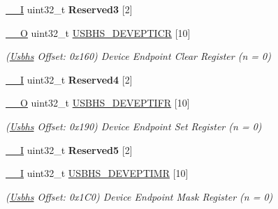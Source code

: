 \begin{DoxyCompactItemize}
\mbox{\label{structUsbhs_ae05cd26710ecf0c9454d6f1dffa3660d}} 
\mbox{\hyperlink{core__cm7_8h_af63697ed9952cc71e1225efe205f6cd3}{\+\_\+\+\_\+I}} uint32\+\_\+t {\bfseries Reserved3} \mbox{[}2\mbox{]}
\item 
\mbox{\label{structUsbhs_aad964276ad3efb07d5b0ed3dd8e030b0}} 
\mbox{\hyperlink{core__cm7_8h_a7e25d9380f9ef903923964322e71f2f6}{\+\_\+\+\_\+O}} uint32\+\_\+t \mbox{\hyperlink{structUsbhs_aad964276ad3efb07d5b0ed3dd8e030b0}{U\+S\+B\+H\+S\+\_\+\+D\+E\+V\+E\+P\+T\+I\+CR}} \mbox{[}10\mbox{]}
\begin{DoxyCompactList}\small\item\em (\mbox{\hyperlink{structUsbhs}{Usbhs}} Offset\+: 0x160) Device Endpoint Clear Register (n = 0) \end{DoxyCompactList}\item 
\mbox{\label{structUsbhs_a8344207a5fd79208cebe5894bfafb638}} 
\mbox{\hyperlink{core__cm7_8h_af63697ed9952cc71e1225efe205f6cd3}{\+\_\+\+\_\+I}} uint32\+\_\+t {\bfseries Reserved4} \mbox{[}2\mbox{]}
\item 
\mbox{\label{structUsbhs_a28f21ec80c0aa71b423cc14786d480c1}} 
\mbox{\hyperlink{core__cm7_8h_a7e25d9380f9ef903923964322e71f2f6}{\+\_\+\+\_\+O}} uint32\+\_\+t \mbox{\hyperlink{structUsbhs_a28f21ec80c0aa71b423cc14786d480c1}{U\+S\+B\+H\+S\+\_\+\+D\+E\+V\+E\+P\+T\+I\+FR}} \mbox{[}10\mbox{]}
\begin{DoxyCompactList}\small\item\em (\mbox{\hyperlink{structUsbhs}{Usbhs}} Offset\+: 0x190) Device Endpoint Set Register (n = 0) \end{DoxyCompactList}\item 
\mbox{\label{structUsbhs_a6c2abc23817560e683c607137a6e65a9}} 
\mbox{\hyperlink{core__cm7_8h_af63697ed9952cc71e1225efe205f6cd3}{\+\_\+\+\_\+I}} uint32\+\_\+t {\bfseries Reserved5} \mbox{[}2\mbox{]}
\item 
\mbox{\label{structUsbhs_ad006a49c411c9f96f707cd64d75df7f1}} 
\mbox{\hyperlink{core__cm7_8h_af63697ed9952cc71e1225efe205f6cd3}{\+\_\+\+\_\+I}} uint32\+\_\+t \mbox{\hyperlink{structUsbhs_ad006a49c411c9f96f707cd64d75df7f1}{U\+S\+B\+H\+S\+\_\+\+D\+E\+V\+E\+P\+T\+I\+MR}} \mbox{[}10\mbox{]}
\begin{DoxyCompactList}\small\item\em (\mbox{\hyperlink{structUsbhs}{Usbhs}} Offset\+: 0x1\+C0) Device Endpoint Mask Register (n = 0) \end{DoxyCompactList}\item 

\end{DoxyCompactItemize}
